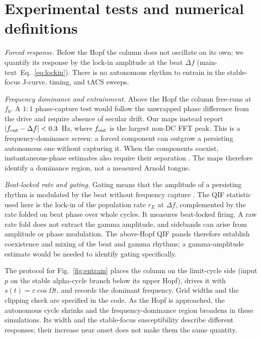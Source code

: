 \section{Experimental tests and numerical definitions}\label{sec:vocab}
\emph{Forced response.} Below the Hopf the column does not oscillate on its own;
we quantify its response by the lock-in amplitude at the beat $\Delta f$
(\ifsupp main-text\fi\ Eq.~\eqref{eq:lockin}). There is no autonomous rhythm to entrain in the stable-focus
J-curve, timing, and tACS sweeps.

\emph{Frequency dominance and entrainment.} Above the Hopf the column free-runs
at $f_0$. A $1{:}1$ phase-capture test would follow the unwrapped phase difference
from the drive and require absence of secular drift. Our maps instead report
$|f_{\rm out}-\Delta f|<0.3$~Hz, where $f_{\rm out}$ is the largest non-DC FFT
peak. This is a frequency-dominance screen: a forced component can outgrow a
persisting autonomous one without capturing it. When the components coexist,
instantaneous-phase estimates also require their separation
\cite{lachaux1999}. The maps therefore identify a dominance region, not a
measured Arnold tongue.

\emph{Beat-locked rate and gating.} Gating means that the amplitude of a
persisting rhythm is modulated by the beat without frequency capture
\cite{canolty2010,tort2010}. The QIF statistic used here is the lock-in of the
population rate $r_E$ at $\Delta f$, complemented by the rate folded on beat
phase over whole cycles. It measures beat-locked firing. A raw rate fold does
not extract the gamma amplitude, and sidebands can arise from amplitude or phase
modulation. The above-Hopf QIF panels therefore establish coexistence and mixing
of the beat and gamma rhythms; a gamma-amplitude estimate would be needed to
identify gating specifically.

The protocol for Fig.~\ref{fig:entrain} places the column on the limit-cycle side
(input $p$ on the stable alpha-cycle branch below its upper Hopf), drives it
with $s(t)=\varepsilon\cos\Omega t$, and records the dominant frequency. Grid
widths and the clipping check are specified in the code. As the Hopf is approached,
the autonomous cycle shrinks and the frequency-dominance region broadens in these
simulations. Its width and the stable-focus susceptibility describe different
responses; their increase near onset does not make them the same quantity.

\ifjne


\fi



